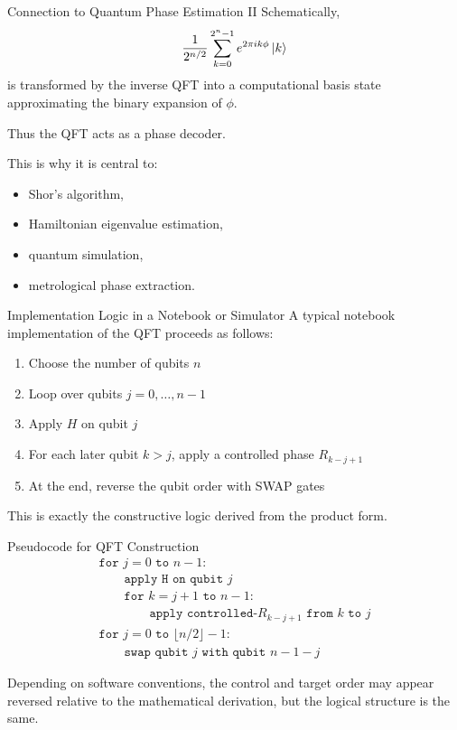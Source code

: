 \documentclass{beamer}
\begin{document}
\begin{frame}{Connection to Quantum Phase Estimation II}
Schematically,
\[
\frac{1}{2^{n/2}}\sum_{k=0}^{2^n-1} e^{2\pi i k\phi}\ket{k}
\]
is transformed by the inverse QFT into a computational basis state approximating the binary expansion of \(\phi\).

Thus the QFT acts as a phase decoder.

This is why it is central to:
\begin{itemize}
\item Shor's algorithm,
\item Hamiltonian eigenvalue estimation,
\item quantum simulation,
\item metrological phase extraction.
\end{itemize}
\end{frame}

\begin{frame}{Implementation Logic in a Notebook or Simulator}
A typical notebook implementation of the QFT proceeds as follows:

\begin{enumerate}
\item Choose the number of qubits \(n\)
\item Loop over qubits \(j=0,\dots,n-1\)
\item Apply \(H\) on qubit \(j\)
\item For each later qubit \(k>j\), apply a controlled phase \(R_{k-j+1}\)
\item At the end, reverse the qubit order with SWAP gates
\end{enumerate}

This is exactly the constructive logic derived from the product form.
\end{frame}

\begin{frame}{Pseudocode for QFT Construction}
\[
\begin{array}{l}
\texttt{for } j=0 \texttt{ to } n-1: \\
\qquad \texttt{apply H on qubit } j \\
\qquad \texttt{for } k=j+1 \texttt{ to } n-1: \\
\qquad\qquad \texttt{apply controlled-}R_{k-j+1}\texttt{ from } k \texttt{ to } j \\
\texttt{for } j=0 \texttt{ to } \lfloor n/2\rfloor-1: \\
\qquad \texttt{swap qubit } j \texttt{ with qubit } n-1-j
\end{array}
\]

Depending on software conventions, the control and target order may appear reversed relative to the mathematical derivation, but the logical structure is the same.
\end{frame}
\end{document}
